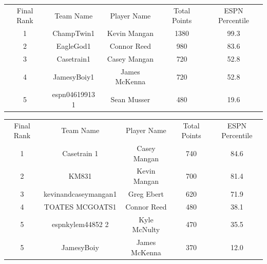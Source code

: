 \documentclass[11pt,letterpaper]{article}
\begin{document}
\vspace{-25pt}
\begin{table} [h]
\begin{center}
\begin{tabular} { c c c c c }
\\ Final Rank & Team Name & Player Name & Total Points & ESPN Percentile
\\ 1 & ChampTwin1 & Kevin Mangan & 1380 & 99.3
\\ 2 & EagleGod1 & Connor Reed & 980 & 83.6
\\ 3 & Casetrain1 & Casey Mangan & 720 & 52.8
\\ 4 & JamesyBoiy1 & James McKenna & 720 & 52.8
\\ 5 & espn04619913 1 & Sean Musser & 480 & 19.6
\end{tabular}
\end{center}
\end{table}

\vspace{-25pt}
\begin{table} [h]
\begin{center}
\begin{tabular} { c c c c c }
\\ Final Rank & Team Name & Player Name & Total Points & ESPN Percentile
\\ 1 & Casetrain 1 & Casey Mangan & 740& 84.6
\\ 2 & KM831 & Kevin Mangan & 700 & 81.4
\\ 3 & kevinandcaseymangan1  & Greg Ebert & 620 & 71.9
\\ 4 & TOATES MCGOATS1 & Connor Reed & 480 & 38.1
\\ 5 & espnkylem44852 2 & Kyle McNulty & 470 & 35.5
\\ 5 & JamesyBoiy & James McKenna & 370 & 12.0
\end{tabular}
\end{center}
\end{table}
\end{document}

